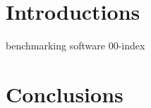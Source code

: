\documentclass[11pt]{report}
\begin{document}

\makecover%


\clearpage
{}
\settableofcontents%
\tableofcontents


\clearpage
\setlistoffigures%
\listoffigures


\clearpage
\setlistoftables%
\listoftables





\chapter[]{Introductions}


{benchmarking}
{software}
{00-index}

\chapter{Conclusions}



\clearpage




\appendix







\makedisclaimer%
\end{document}
